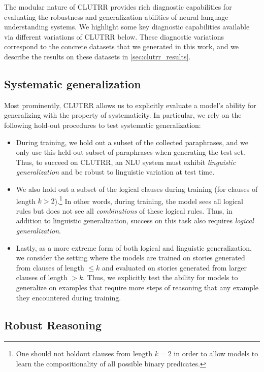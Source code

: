 \documentclass[letterpaper, 12pt]{report}
\begin{document}
The modular nature of CLUTRR provides rich diagnostic capabilities for evaluating the robustness and generalization abilities of neural language understanding systems.
We highlight some key diagnostic capabilities available via different variations of CLUTRR below.
These diagnostic variations correspond to the concrete datasets that we generated in this work, and we describe the results on these datasets in \autoref{sec:clutrr_results}.

\subsection{Systematic generalization}

Most prominently, CLUTRR allows us to explicitly evaluate a model's ability for generalizing with the property of systematicity.
In particular, we rely on the following hold-out procedures to test systematic generalization:
\begin{itemize}[leftmargin=*, topsep=2pt, itemsep=2pt, parsep=2pt]
    \item During training, we hold out a subset of the collected paraphrases, and we only use this held-out subset of paraphrases when generating the test set.
    Thus, to succeed on CLUTRR, an NLU system must exhibit {\em linguistic generalization} and be robust to linguistic variation at test time.
    \item We also hold out a subset of the logical clauses during training (for clauses of length $k > 2$).\footnote{One should not holdout clauses from length $k=2$ in order to allow models to learn the compositionality of all possible binary predicates.}
    In other words, during training, the model sees all logical rules but does not see all {\em combinations} of these logical rules.
    Thus, in addition to linguistic generalization, success on this task also requires {\em logical generalization}.
    \item
    Lastly, as a more extreme form of both logical and linguistic generalization, we consider the setting where the models are trained on stories generated from clauses of length ${\leq k}$ and evaluated on stories generated from larger clauses of length ${>k}$. Thus, we explicitly test the ability for models to generalize on examples that require more steps of reasoning that any example they encountered during training.
\end{itemize}

\subsection{Robust Reasoning}
\label{sec:clutrr_robust_data}
\end{document}
